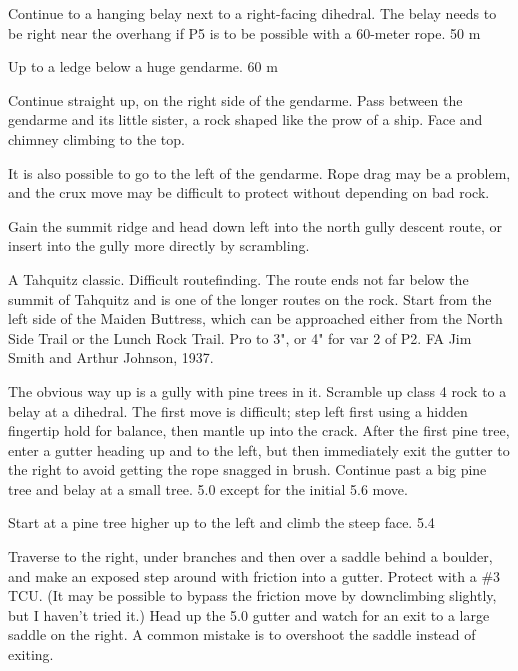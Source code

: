 \documentclass{tahquitz}
\begin{document}
 Continue to a hanging
belay next to a right-facing dihedral. The belay needs to be right near the
overhang if P5 is to be possible with a 60-meter rope. 50 m

 Up to a ledge below a huge gendarme. 60 m

 Continue straight up, on the right side of the gendarme.
Pass between the gendarme and its little sister, a rock shaped like
the prow of a ship. Face and chimney climbing to the top.

 It is also possible to go to the left of the gendarme.
Rope drag may be a problem, and the crux move may be difficult to protect
without depending on bad rock.

Gain the summit ridge and head down left into the north gully descent route,
or insert into the gully more directly by scrambling.





A Tahquitz classic. Difficult routefinding. The route ends not far
below the summit of Tahquitz and is one of the longer routes on the
rock. Start from the left side of the Maiden Buttress, which can be
approached either from the North Side Trail or the Lunch Rock Trail.
Pro to 3", or 4" for var 2 of P2.
FA Jim Smith and Arthur Johnson, 1937.

 The obvious way up is a gully with pine trees in it. Scramble up
class 4 rock to a belay at a dihedral. The first move is difficult;
step left first using a hidden fingertip hold for balance, then mantle
up into the crack.
After the first pine tree, enter a gutter heading up
and to the left, but then immediately exit the gutter to the right to
avoid getting the rope snagged in brush. Continue past a big pine
tree and belay at a small tree. 5.0 except for the initial 5.6
move.

 Start at a pine tree higher up to the left and climb
the steep face. 5.4

 Traverse to the right, under branches and then over a saddle behind a boulder, and make
an exposed step around with friction into a gutter.  Protect with a
\#3 TCU. (It may be possible to bypass the friction move by downclimbing
slightly, but I haven't tried it.) Head up the 5.0 gutter and watch for an exit to a large saddle
on the right. A common mistake is to overshoot the saddle instead of
exiting.
\end{document}

